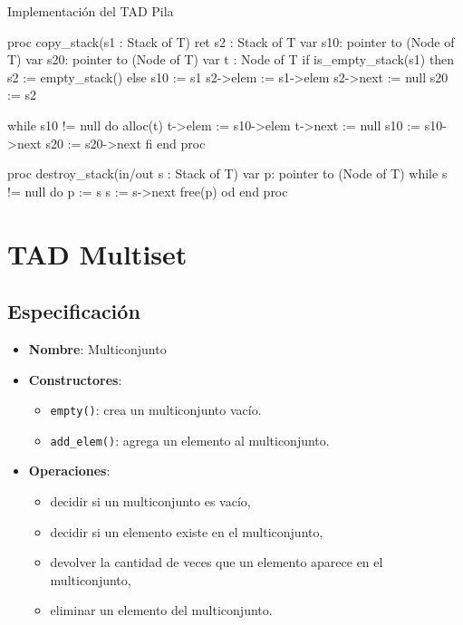\begin{codebox}{Implementación del TAD Pila}
\begin{pascallike}
proc copy_stack(s1 : Stack of T) ret s2 : Stack of T
    var s10: pointer to (Node of T)
    var s20: pointer to (Node of T)
    var t : Node of T
    if is_empty_stack(s1) then
        s2 := empty_stack()
    else
        s10 := s1 
        s2->elem := s1->elem
        s2->next := null
        s20 := s2

    while s10 != null do
        alloc(t)
        t->elem := s10->elem
        t->next := null
        s10 := s10->next
        s20 := s20->next
    fi
end proc

proc destroy_stack(in/out s : Stack of T)
    var p: pointer to (Node of T)
    while s != null do
        p := s
        s := s->next
        free(p)
    od
end proc
\end{pascallike}
\end{codebox}

\section{TAD Multiset}

\subsection{Especificación}
\begin{itemize}
    \item \textbf{Nombre}: Multiconjunto
    \item \textbf{Constructores}:
    \begin{itemize}
        \item \texttt{empty()}: crea un multiconjunto vacío.
        \item \texttt{add\_elem()}: agrega un elemento al multiconjunto.
    \end{itemize}
    \item \textbf{Operaciones}:
    \begin{itemize}
        \item decidir si un multiconjunto es vacío,
        \item decidir si un elemento existe en el multiconjunto,
        \item devolver la cantidad de veces que un elemento aparece en el multiconjunto,
        \item eliminar un elemento del multiconjunto.
    \end{itemize}
\end{itemize}

